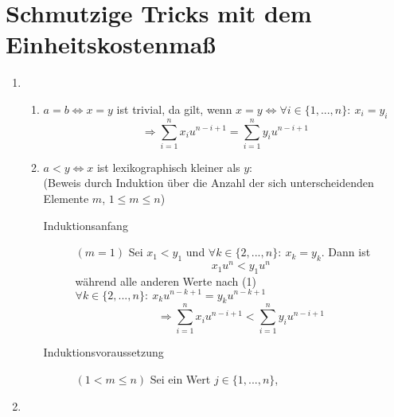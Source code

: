 \documentclass[a4paper,10pt]{scrartcl}
\renewcommand{\labelenumii}{(\theenumii)}
\renewcommand{\theenumii}{\roman{enumii}}
\begin{document}
\section{Schmutzige Tricks mit dem Einheitskostenmaß}
\begin{enumerate}
\item   \renewcommand{\labelenumii}{(\theenumii)}
        \renewcommand{\theenumii}{\arabic{enumii}}
        \begin{enumerate}
        \item   $a = b \Leftrightarrow x = y$ ist trivial, da gilt, wenn 
                $x = y \Leftrightarrow \forall i \in \{1, ..., n\}{:}\ x_i = y_i$\\
                \[\Rightarrow \sum\limits_{i=1}^{n} x_{i}u^{n-i+1} = \sum\limits_{i=1}^{n} y_{i}u^{n-i+1}\]
        \item   $a < y \Leftrightarrow x$ ist lexikographisch kleiner als $y$:\\
                (Beweis durch Induktion über die Anzahl der sich unterscheidenden Elemente $m$, $1 \leq m \leq n$)
                \begin{description}
                \item[Induktionsanfang] $(m=1)$ Sei $x_1 < y_1$ und $\forall k \in \{2, ..., n\}{:}\ x_k = y_k$. Dann ist
                    \[x_1 u^{n} < y_1 u^{n}\]
                    während alle anderen Werte nach (1) 
                    $\forall k \in \{2, ..., n\}{:}\ x_k u^{n-k+1} = y_k u^{n-k+1}$
                    \[\Rightarrow \sum\limits_{i=1}^{n} x_{i}u^{n-i+1} < \sum\limits_{i=1}^{n} y_{i}u^{n-i+1}\]
                \item[Induktionsvoraussetzung] $(1 < m \leq n)$ Sei ein Wert $j \in \{1, ..., n\}$, 
                \end{description}
        \end{enumerate}
\item   
\end{enumerate}
\end{document}
